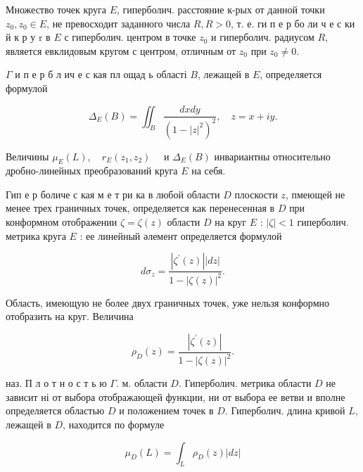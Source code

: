 \documentclass[10pt]{article}
\begin{document}
Множество точек круга $E$, гиперболич. расстояние к-рых от данной точки $z_{0}, z_{0} \in E$, не превосходит заданного числа $R, R>0$, т. е. ги п е р бо ли ч е с ки й к р у $\mathrm{r}$ в $E$ с гиперболич. центром в точке $z_{0}$ и гиперболич. радиусом $R$, является евклидовым кругом с центром, отличным от $z_{0}$ при $z_{0} \neq 0$.



$\Gamma$ и п е р б л ич е с кая пл ощад ь області $B$, лежащей в $E$, определяется формулой



\[

\Delta_{E}(B)=\iint_{B} \frac{d x d y}{\left(1-|z|^{2}\right)^{2}}, \quad z=x+i y .

\]



Величины $\mu_{E}(L), \quad r_{E}\left(z_{1}, z_{2}\right) \quad$ и $\Delta_{E}(B)$ инвариантны относительно дробно-линейных преобразований круга $E$ на себя.



Гип е р боличе с кая м е т ри ка в любой области $D$ плоскости $z$, пмеющей не менее трех граничных точек, определяется как перенесенная в $D$ при конформном отображении $\zeta=\zeta(z)$ области $D$ на круг $E$ : $|\zeta|<1$ гиперболич. метрика круга $E$ : ее линейный әлемент определяется формулой



\[

d \sigma_{z}=\frac{\left|\zeta^{\prime}(z)\right||d z|}{1-|\zeta(z)|^{2}} .

\]



Область, имеющую не более двух граничных точек, уже нельзя конформно отобразить на круг. Величина



\[

\rho_{D}(z)=\frac{\left|\zeta^{\prime}(z)\right|}{1-|\zeta(z)|^{2}} .

\]



наз. П л о т н о с т ь ю $\Gamma$. м. области $D$. Гиперболич. метрика области $D$ не зависит ні от выбора отображающей функции, ни от выбора ее ветви и вполне определяется областью $D$ и положением точек в $D$. Гиперболич. длина кривой $L$, лежащей в $D$, находится по формуле



\[

\mu_{D}(L)=\int_{L} \rho_{D}(z)|d z|

\]
\end{document}

